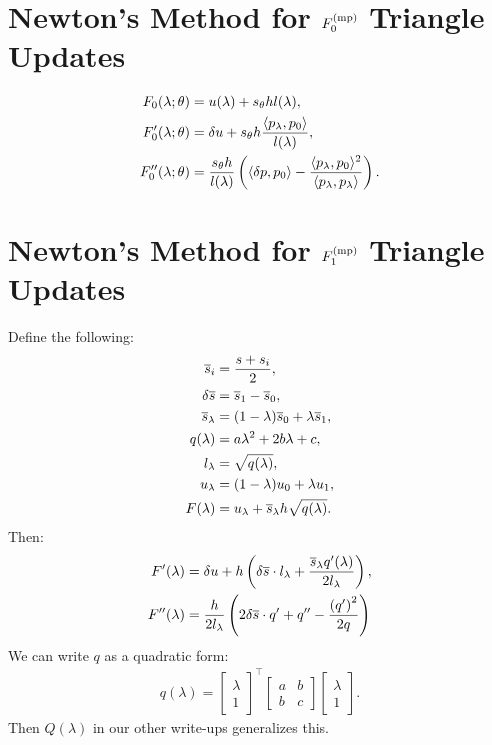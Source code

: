 \documentclass[eikonal.tex]{subfiles}
\begin{document}
\section{Newton's Method for $F_0^{\operatorname{(mp)}}$ Triangle Updates}

\begin{align*}
  F_0(\lambda; \theta) &= u(\lambda) + s_\theta h l(\lambda), \\
  F_0'(\lambda; \theta) &= \delta u + s_\theta h \frac{\langle p_\lambda, p_0 \rangle}{l(\lambda)}, \\
  F_0''(\lambda; \theta) &= \frac{s_\theta h}{l(\lambda)} \left(\langle \delta p, p_0 \rangle - \frac{\langle p_\lambda, p_0 \rangle^2}{\langle p_\lambda, p_\lambda \rangle}\right).
\end{align*}

\section{Newton's Method for $F_1^{\operatorname{(mp)}}$ Triangle Updates}

Define the following:
\begin{align*}
  \overline{s}_i &= \frac{s + s_i}{2}, \\
  \delta \overline{s} &= \overline{s}_1 - \overline{s}_0, \\
  \overline{s}_\lambda &= (1 - \lambda)\overline{s}_0 + \lambda \overline{s}_1, \\
  q(\lambda) &= a\lambda^2 + 2b\lambda + c, \\
  l_\lambda &= \sqrt{q(\lambda)}, \\
  u_\lambda &= (1 - \lambda)u_0 + \lambda u_1, \\
  F(\lambda) &= u_\lambda + \overline{s}_\lambda h \sqrt{q(\lambda)}.
\end{align*}
Then:
\begin{align*}
  F'(\lambda) &= \delta u + h\left(\delta\overline{s}\cdot{}l_\lambda + \frac{\overline{s}_\lambda q'(\lambda)}{2 l_\lambda}\right), \\
  F''(\lambda) &= \frac{h}{2 l_\lambda} \left(2 \delta\overline{s}\cdot{}q' + q'' - \frac{{(q')}^2}{2 q}\right)
\end{align*}
We can write $q$ as a quadratic form:
\begin{align*}
  q(\lambda) = \begin{bmatrix} \lambda \\ 1 \end{bmatrix}^\top \begin{bmatrix} a & b \\ b & c \end{bmatrix} \begin{bmatrix} \lambda \\ 1 \end{bmatrix}.
\end{align*}
Then $Q(\lambda)$ in our other write-ups generalizes this.
\end{document}
